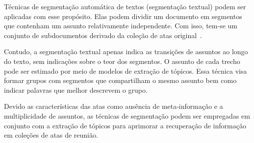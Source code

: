 


Técnicas de segmentação automática de textos (segmentação textual) podem ser aplicadas com esse propósito. Elas podem dividir um documento em segmentos que contenham um assunto relativamente independente. Com isso, tem-se um conjunto de subdocumentos derivado da coleção de atas original~\cite{Aggarwal2018, bokaei2015, sakahara2014, misra2009, eisenstein2008, choi2000}.






Contudo, a segmentação textual apenas indica as transições de assuntos ao longo do texto,  sem indicações sobre o teor dos segmentos. O assunto de cada trecho pode ser estimado por meio de modelos de extração de tópicos. Essa técnica visa formar grupos com segmentos que compartilham o mesmo assunto bem como indicar palavras que melhor descrevem o grupo.










Devido as características das atas como ausência de meta-informação e a multiplicidade de assuntos, as técnicas de segmentação podem ser empregadas em conjunto com a extração de tópicos para aprimorar a recuperação de informação em coleções de atas de reunião. 

